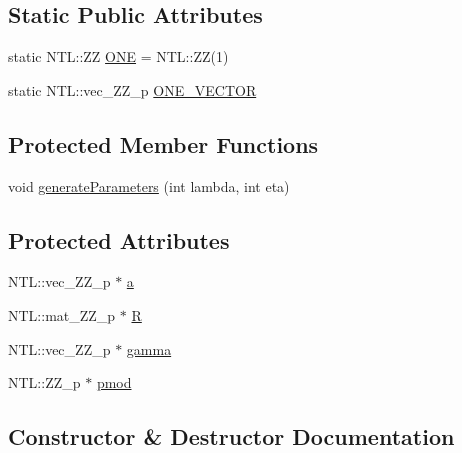 \subsection*{Static Public Attributes}
\begin{DoxyCompactItemize}
\item 
static N\+T\+L\+::\+ZZ \hyperlink{classHE2Encipher_a85145ccd52161ab492eca360daad9b00}{O\+NE} = N\+T\+L\+::\+ZZ(1)
\item 
static N\+T\+L\+::vec\+\_\+\+Z\+Z\+\_\+p \hyperlink{classHE2Encipher_a4099b9dff30fbe3fa5a36d7f5a8a2073}{O\+N\+E\+\_\+\+V\+E\+C\+T\+OR}
\end{DoxyCompactItemize}
\subsection*{Protected Member Functions}
\begin{DoxyCompactItemize}
\item 
void \hyperlink{classHE2Encipher_a13305651228f50d55e6ee905032e01af}{generate\+Parameters} (int lambda, int eta)
\end{DoxyCompactItemize}
\subsection*{Protected Attributes}
\begin{DoxyCompactItemize}
\item 
N\+T\+L\+::vec\+\_\+\+Z\+Z\+\_\+p $\ast$ \hyperlink{classHE2Encipher_a84192e155c19195867671fa085f9c73c}{a}
\item 
N\+T\+L\+::mat\+\_\+\+Z\+Z\+\_\+p $\ast$ \hyperlink{classHE2Encipher_af01e9f2e19df354cecde3f7ea66524a0}{R}
\item 
N\+T\+L\+::vec\+\_\+\+Z\+Z\+\_\+p $\ast$ \hyperlink{classHE2Encipher_acb629492d1edb07e4ac6d2dca60c582a}{gamma}
\item 
N\+T\+L\+::\+Z\+Z\+\_\+p $\ast$ \hyperlink{classHE2Encipher_a0fc7c51d125b4b638b59dfe5bd99976c}{pmod}
\end{DoxyCompactItemize}


\subsection{Constructor \& Destructor Documentation}
\mbox{\label{classHE2Encipher_ab639560a28321b94af1ae72b7d375f58}} 
